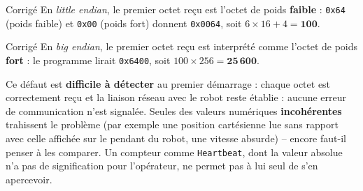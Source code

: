 \begin{UPSTIactivite}

\begin{UPSTIcorrectionP}{Corrigé}
En \emph{little endian}, le premier octet reçu est l'octet de poids
\textbf{faible} : \texttt{0x64} (poids faible) et \texttt{0x00} (poids
fort) donnent \texttt{0x0064}, soit
$6\times16+4 = \mathbf{100}$.
\end{UPSTIcorrectionP}


\begin{UPSTIcorrectionP}{Corrigé}
En \emph{big endian}, le premier octet reçu est interprété comme l'octet de
poids \textbf{fort} : le programme lirait \texttt{0x6400}, soit
$100\times256 = \mathbf{25\,600}$.

Ce défaut est \textbf{difficile à détecter} au premier démarrage : chaque
octet est correctement reçu et la liaison réseau avec le robot reste
établie : aucune erreur de communication n'est signalée. Seules des
valeurs numériques \textbf{incohérentes} trahissent le problème (par
exemple une position cartésienne lue sans rapport avec celle affichée sur
le pendant du robot, une vitesse absurde) -- encore faut-il penser à les
comparer. Un compteur comme \texttt{Heartbeat}, dont la valeur absolue n'a
pas de signification pour l'opérateur, ne permet pas à lui seul de s'en
apercevoir.
\end{UPSTIcorrectionP}
\end{UPSTIactivite}
